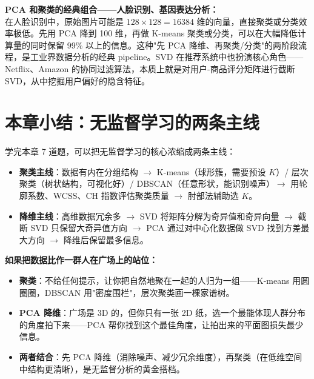 \documentclass[a4paper,11pt]{ctexart}
\begin{document}
\begin{appbox}[现实应用场景]
    \textbf{PCA 和聚类的经典组合——人脸识别、基因表达分析：}\\
    在人脸识别中，原始图片可能是 $128 \times 128 = 16384$ 维的向量，直接聚类或分类效率极低。先用 PCA 降到 100 维，再做 K-means 聚类或分类，可以在大幅降低计算量的同时保留 99\% 以上的信息。这种"先 PCA 降维、再聚类/分类"的两阶段流程，是工业界数据分析的经典 pipeline。SVD 在推荐系统中也扮演核心角色——Netflix、Amazon 的协同过滤算法，本质上就是对用户-商品评分矩阵进行截断 SVD，从中挖掘用户偏好的隐含特征。
\end{appbox}


\section{本章小结：无监督学习的两条主线}

学完本章 7 道题，可以把无监督学习的核心浓缩成两条主线：

\begin{itemize}
    \item \textbf{聚类主线}：数据有内在分组结构 $\to$ K-means（球形簇，需要预设 $K$）/ 层次聚类（树状结构，可视化好）/ DBSCAN（任意形状，能识别噪声）$\to$ 用轮廓系数、WCSS、CH 指数评估聚类质量 $\to$ 肘部法辅助选 $K$。
    \item \textbf{降维主线}：高维数据冗余多 $\to$ SVD 将矩阵分解为奇异值和奇异向量 $\to$ 截断 SVD 只保留大奇异值方向 $\to$ PCA 通过对中心化数据做 SVD 找到方差最大方向 $\to$ 降维后保留最多信息。
\end{itemize}

\begin{metaphorbox}[给零基础读者的一句总比喻]
    \textbf{如果把数据比作一群人在广场上的站位：}
    \begin{itemize}
        \item \textbf{聚类}：不给任何提示，让你把自然地聚在一起的人归为一组——K-means 用圆圈圈，DBSCAN 用"密度围栏"，层次聚类画一棵家谱树。
        \item \textbf{PCA 降维}：广场是 3D 的，但你只有一张 2D 纸，选一个最能体现人群分布的角度拍下来——PCA 帮你找到这个最佳角度，让拍出来的平面图损失最少信息。
        \item \textbf{两者结合}：先 PCA 降维（消除噪声、减少冗余维度），再聚类（在低维空间中结构更清晰），是无监督分析的黄金搭档。
    \end{itemize}
\end{metaphorbox}
\end{document}
